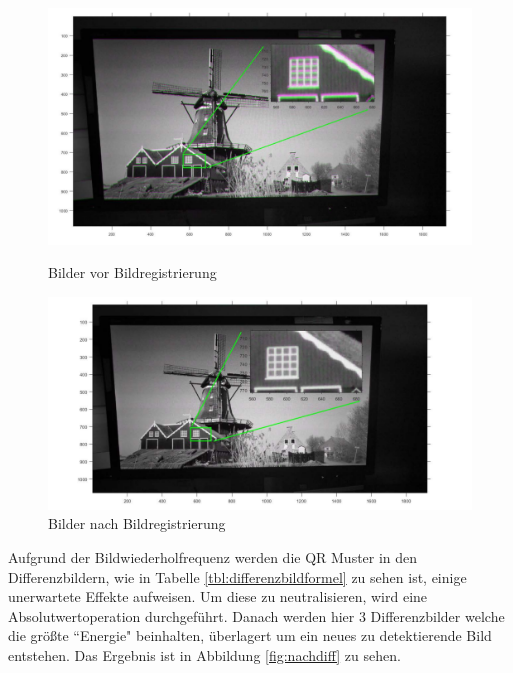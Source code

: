\begin{figure}[H]
\centering 
\begin{minipage}[b]{0.49\textwidth} 
\centering 
\includegraphics[width=1.0\textwidth]{images/5_Implementirung/vorregistration.pdf} 
\caption{Bilder vor Bildregistrierung}
\label{fig:vorregistration}
\end{minipage}
\begin{minipage}[b]{0.49\textwidth} 
\centering 
\includegraphics[width=1.1\textwidth]{images/5_Implementirung/nachregis.pdf}
\caption{Bilder nach Bildregistrierung}
\label{fig:nachregis}
\end{minipage}
\end{figure}
 
Aufgrund der Bildwiederholfrequenz werden die QR Muster in den Differenzbildern, wie in Tabelle \ref{tbl:differenzbildformel} zu sehen ist, einige unerwartete Effekte aufweisen. Um diese zu neutralisieren, wird eine Absolutwertoperation durchgeführt. Danach werden hier 3 Differenzbilder welche die größte ``Energie" beinhalten, überlagert um ein neues zu detektierende Bild entstehen. Das Ergebnis ist in Abbildung \ref{fig:nachdiff} zu sehen. 

